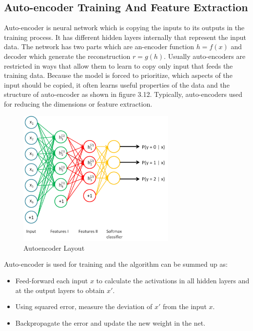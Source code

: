 \subsection{Auto-encoder Training And Feature Extraction}
Auto-encoder is neural network which is copying the inputs to its outputs in the training process.
It has different hidden layers internally that represent the input data.
The network has two parts which are an-encoder function $h=f(x)$ and decoder which generate the reconstruction $r=g(h)$.
Usually auto-encoders are restricted in ways that allow them to learn to copy only input that feeds the training data.
Because the model is forced to prioritize, which aspects of the input should be copied, it often learns useful properties of the data and the structure of auto-encoder as shown in figure 3.12.
Typically, auto-encoders used for reducing the dimensions or feature extraction.

\begin{figure}[htb]
        \centering
        \includegraphics[width = 0.7\textwidth]{figures/Autoencoder.png} %
  \caption{Autoencoder Layout}
  \label{fig:Autoencoder Layout}
\end{figure} 

Auto-encoder is used for training and the algorithm can be summed up as:
\begin{itemize}
\item Feed-forward each input $x$ to calculate the activations in all hidden layers and at the output layers to obtain $x'$.
\item Using squared error, measure the deviation of $x'$ from the input $x$.
\item Backpropagate the error and update the new weight in the net.  
\end{itemize}

